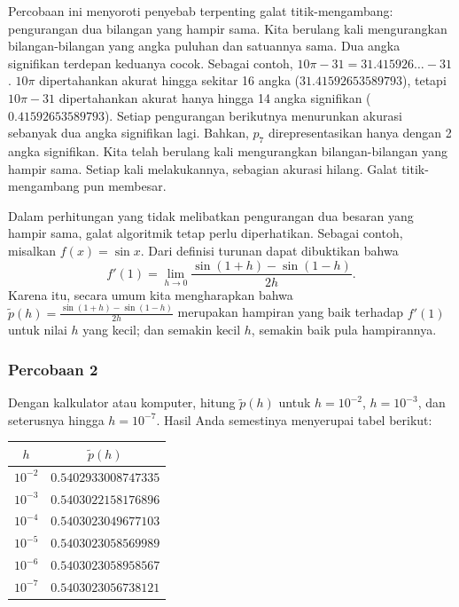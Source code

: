 Percobaan ini menyoroti penyebab terpenting galat titik-mengambang:
pengurangan dua bilangan yang hampir sama. Kita berulang kali mengurangkan
bilangan-bilangan yang angka puluhan dan satuannya sama. Dua angka
signifikan terdepan keduanya cocok. Sebagai contoh, $10\pi-31=31.415926\ldots-31$.
$10\pi$ dipertahankan akurat hingga sekitar 16 angka ($31.41592653589793$),
tetapi $10\pi-31$ dipertahankan akurat hanya hingga 14 angka signifikan
($0.41592653589793$). Setiap pengurangan berikutnya menurunkan akurasi
sebanyak dua angka signifikan lagi. Bahkan, $p_{7}$ direpresentasikan
hanya dengan 2 angka signifikan. Kita telah berulang kali mengurangkan
bilangan-bilangan yang hampir sama. Setiap kali melakukannya, sebagian
akurasi hilang. Galat titik-mengambang pun membesar.

Dalam perhitungan yang tidak melibatkan pengurangan dua besaran yang
hampir sama, galat algoritmik tetap perlu diperhatikan. Sebagai contoh,
misalkan $f(x)=\sin x$. Dari definisi turunan dapat dibuktikan bahwa
\[
f'(1)=\lim_{h\to0}\frac{\sin(1+h)-\sin(1-h)}{2h}.
\]
Karena itu, secara umum kita mengharapkan bahwa $\tilde{p}(h)=\frac{\sin(1+h)-\sin(1-h)}{2h}$
merupakan hampiran yang baik terhadap $f'(1)$ untuk nilai $h$ yang
kecil; dan semakin kecil $h$, semakin baik pula hampirannya. 

\subsubsection{Percobaan 2\label{subsec:derivativeExperiment}}

Dengan kalkulator atau komputer, hitung $\tilde{p}(h)$ untuk $h=10^{-2}$,
$h=10^{-3}$, dan seterusnya hingga $h=10^{-7}$. Hasil Anda semestinya
menyerupai tabel berikut:

\begin{center}
\begin{tabular}{c|c}
$h$ & $\tilde{p}(h)$\tabularnewline
\hline 
$10^{-2}$ & $0.5402933008747335$\tabularnewline
$10^{-3}$ & $0.5403022158176896$\tabularnewline
$10^{-4}$ & $0.5403023049677103$\tabularnewline
$10^{-5}$ & $0.5403023058569989$\tabularnewline
$10^{-6}$ & $0.5403023058958567$\tabularnewline
$10^{-7}$ & $0.5403023056738121$\tabularnewline
\end{tabular}
\par\end{center}

